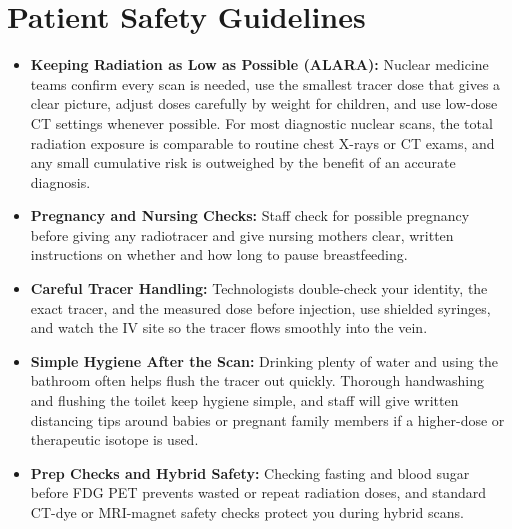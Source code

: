 \section{Patient Safety Guidelines}
\begin{itemize}
  \item \textbf{Keeping Radiation as Low as Possible (ALARA):} Nuclear medicine teams confirm every scan is needed, use the smallest tracer dose that gives a clear picture, adjust doses carefully by weight for children, and use low-dose CT settings whenever possible. For most diagnostic nuclear scans, the total radiation exposure is comparable to routine chest X-rays or CT exams, and any small cumulative risk is outweighed by the benefit of an accurate diagnosis.
  \item \textbf{Pregnancy and Nursing Checks:} Staff check for possible pregnancy before giving any radiotracer and give nursing mothers clear, written instructions on whether and how long to pause breastfeeding.
  \item \textbf{Careful Tracer Handling:} Technologists double-check your identity, the exact tracer, and the measured dose before injection, use shielded syringes, and watch the IV site so the tracer flows smoothly into the vein.
  \item \textbf{Simple Hygiene After the Scan:} Drinking plenty of water and using the bathroom often helps flush the tracer out quickly. Thorough handwashing and flushing the toilet keep hygiene simple, and staff will give written distancing tips around babies or pregnant family members if a higher-dose or therapeutic isotope is used.
  \item \textbf{Prep Checks and Hybrid Safety:} Checking fasting and blood sugar before FDG PET prevents wasted or repeat radiation doses, and standard CT-dye or MRI-magnet safety checks protect you during hybrid scans.
\end{itemize}

